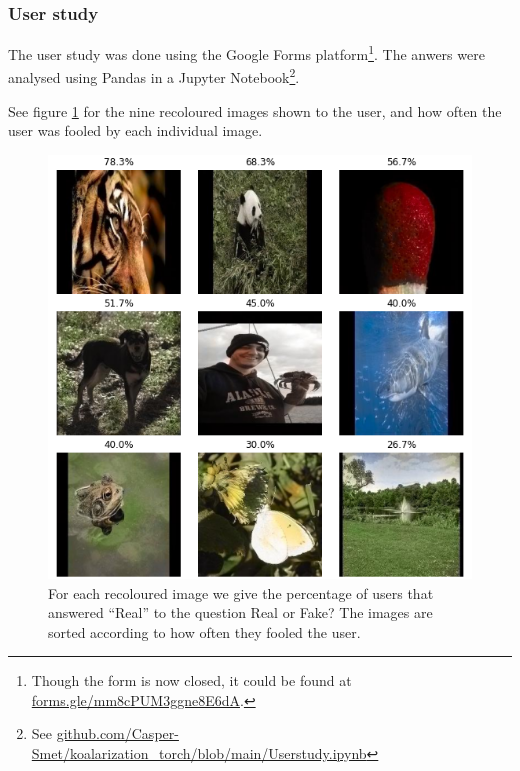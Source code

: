 \documentclass{article}
\begin{document}
        
        \subsubsection{User study}
        The user study was done using the Google Forms platform\footnote{Though the form is now closed, it could be found at \href{https://forms.gle/mm8cPUM3ggne8E6dA}{forms.gle/mm8cPUM3ggne8E6dA}.}. The anwers were analysed using Pandas in a Jupyter Notebook\footnote{See \href{https://github.com/Casper-Smet/koalarization\_torch/blob/main/Userstudy.ipynb}{github.com/Casper-Smet/koalarization\_torch/blob/main/Userstudy.ipynb}}.
        
        See figure \ref{fig:fool_res} for the nine recoloured images shown to the user, and how often the user was fooled by each individual image.
        
            \begin{figure}[H]
                \centering
                \includegraphics[width=\textwidth]{img/results_colourised.png}
                \caption{For each recoloured image we give the percentage of users that answered “Real” to the question Real or Fake? The images are sorted according to how often they fooled the user.}
                \label{fig:fool_res}
            \end{figure}
        
\end{document}

